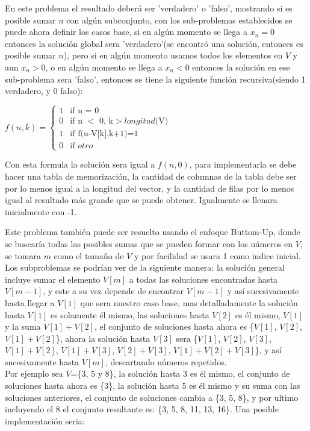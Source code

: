 \documentclass[12pt, a4paper]{article}
\newcommand\cppfile[2][]{

}
\begin{document}
	En este problema el resultado deberá ser 'verdadero' o 'falso', mostrando si es posible sumar $n$ con algún 
	subconjunto, con los sub-problemas establecidos se puede ahora definir los casos base, si en algún momento 
	se llega a $x_{n}=0$ entonces la solución global sera 'verdadero'(se encontró una solución, entonces es posible 
	sumar $n$), pero si en algún momento usamos todos los elementos en $V$ y aun $x_{n}>0$, o 
	en algún momento se llega a $x_{n}<0$ entonces la solución en ese sub-problema sera 'falso', entonces se tiene la
	siguiente función recursiva(siendo 1 verdadero, y 0 falso):
	\begin{center}
		$f(n, k) = 	
		\begin{cases}
			1 & \text{if n = 0}\\
			0 & \text{if n $<$ 0, k$>longitud( $V$)$}\\
			1 & \text{if f(n-V[k],k+1)=1}\\
			0 & \text{if $otro$}
		\end{cases}
		$\\
	\end{center}
	Con esta formula la solución sera igual a $f(n,0)$, para implementarla se debe hacer una tabla de memorización,
	la cantidad de columnas de la tabla debe ser por lo menos igual a la longitud del vector, y la cantidad 
	de filas por lo menos igual al resultado más grande que se puede obtener. Igualmente se llenara inicialmente con -1.
	\cppfile[24-33]{Programacion_dinamica/codigos/SubSetSum.cpp}
	
	Este problema también puede ser resuelto usando el enfoque Buttom-Up, donde se buscaría todas las posibles 
	sumas que se pueden formar con los números en $V$, se tomara $m$ como el tamaño de $V$ y por facilidad se usara 1 
	como indice inicial. Los subproblemas se podrían ver de la siguiente manera: la solución general incluye sumar el
	elemento $V[m]$ a todas las soluciones encontradas hasta $V[m-1]$, y este a su vez depende de encontrar $V[m-1]$
	y así sucesivamente hasta llegar a $V[1]$ que sera nuestro caso base, mas detalladamente la solución hasta $V[1]$ 
	es solamente él mismo, las soluciones hasta $V[2]$ es él mismo, $V[1]$ y la suma $V[1]+V[2]$, el conjunto de
	soluciones hasta ahora es \{$V[1]$, $V[2]$, $V[1]+V[2]$\}, ahora la solución hasta $V[3]$ sera 
	\{$V[1]$, $V[2]$, $V[3]$, $V[1]+V[2]$, $V[1]+V[3]$, $V[2]+V[3]$, $V[1]+V[2]+V[3]$\}, y así sucesivamente hasta 
	$V[m]$, descartando números repetidos.\\
	
	Por ejemplo sea $V$=\{3, 5 y 8\}, la solución hasta 3 es él mismo, el conjunto de soluciones hasta ahora es \{3\},
	la solución hasta 5 es él mismo y su suma con las soluciones anteriores, el conjunto de soluciones cambia a 
	\{3, 5, 8\}, y por ultimo incluyendo el 8 el conjunto resultante es: \{3, 5, 8, 11, 13, 16\}. Una posible
	implementación seria:\\
	\cppfile[8-21]{Programacion_dinamica/codigos/SubSetSum.cpp}
	
\end{document}
